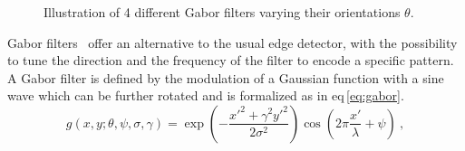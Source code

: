 \begin{enumerate}[leftmargin=*]
\begin{figure}
  \hspace*{\fill}
  \hfill
  \hfill
  \hfill
  \hspace*{\fill}
  \caption[Illustration of 4 different Gabor filters.]{Illustration of 4
    different Gabor filters varying their orientations $\theta$.}
  \label{fig:gabor}
\end{figure}

Gabor filters~\cite{Gabor1946,Daugman1985} offer an alternative to the usual
edge detector, with the possibility to tune the direction and the frequency of
the filter to encode a specific pattern.
A Gabor filter is defined by the modulation of a Gaussian function with a sine
wave which can be further rotated and is formalized as in
\acs{eq}\,\ref{eq:gabor}.
\begin{equation}
  g(x,y;\theta,\psi,\sigma,\gamma) = \exp \left( - \frac{x'^{2}+
      \gamma^{2}y'^{2}}{2 \sigma^{2}} \right) \cos \left( 2 \pi
    \frac{x'}{\lambda} + \psi \right) \ ,
  \label{eq:gabor}
\end{equation}


\end{enumerate}
